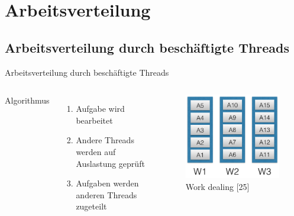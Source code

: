 \documentclass{beamer}
\begin{document}
\section{Arbeitsverteilung}
\subsection{Arbeitsverteilung durch besch\"aftigte Threads}

\begin{frame}{Arbeitsverteilung durch besch\"aftigte Threads}
\begin{columns}

        Algorithmus
        \begin{enumerate}
        \item Aufgabe wird bearbeitet
        \item Andere Threads werden auf Auslastung gepr\"uft
        \item Aufgaben werden anderen Threads zugeteilt
        \end{enumerate}

        
        
        \begin{figure}
        \centering
        \includegraphics[width=1\columnwidth]{./assets/init.png}
        \caption{Work dealing \cite{Herlihy1}[25]}
        \label{fig:my_label}
        \end{figure}
\end{columns}
\end{frame}
\end{document}
